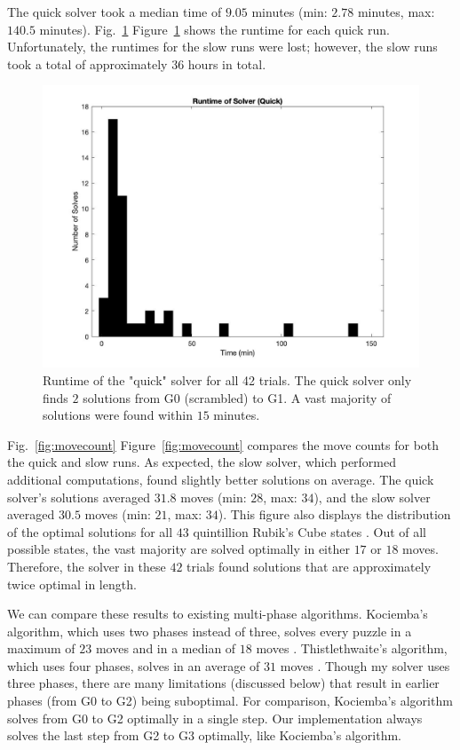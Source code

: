 \documentclass{article}
\newcommand{\fref}[2][]{%
  \ifthenelse{\equal{#1}{}}%
	{Fig.~\ref{fig:#2}}%
	{Figure~\ref{fig:#2}}}
\begin{document}
The quick solver took a median time of $9.05$ minutes (min: $2.78$ minutes, max: $140.5$ minutes). \fref{runtime} shows the runtime for each quick run. Unfortunately, the runtimes for the slow runs were lost; however, the slow runs took a total of approximately $36$ hours in total.

\begin{figure}
	\centering
    \includegraphics[width=5.5in]{runtime.jpg}
	\caption{Runtime of the "quick" solver for all 42 trials. The quick solver only finds $2$ solutions from G0 (scrambled) to G1. A vast majority of solutions were found within $15$ minutes.}
	\label{fig:runtime}
\end{figure}

\fref{movecount} compares the move counts for both the quick and slow runs. As expected, the slow solver, which performed additional computations, found slightly better solutions on average. The quick solver's solutions averaged $31.8$ moves (min: $28$, max: $34$), and the slow solver averaged $30.5$ moves (min: $21$, max: $34$). This figure also displays the distribution of the optimal solutions for all $43$ quintillion Rubik's Cube states \cite{god}. Out of all possible states, the vast majority are solved optimally in either $17$ or $18$ moves. Therefore, the solver in these $42$ trials found solutions that are approximately twice optimal in length.

We can compare these results to existing multi-phase algorithms. Kociemba's algorithm, which uses two phases instead of three, solves every puzzle in a maximum of $23$ moves and in a median of $18$ moves \cite{kociemba-dist}. Thistlethwaite's algorithm, which uses four phases, solves in an average of $31$ moves \cite{thistle-dist}. Though my solver uses three phases, there are many limitations (discussed below) that result in earlier phases (from G0 to G2) being suboptimal. For comparison, Kociemba's algorithm solves from G0 to G2 optimally in a single step. Our implementation always solves the last step from G2 to G3 optimally, like Kociemba's algorithm.
\end{document}
